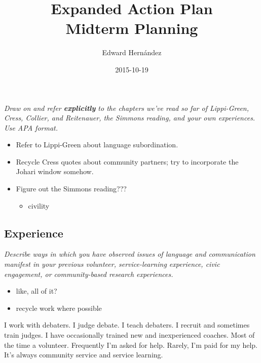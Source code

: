 \documentclass[doc,12pt]{apa6}
\begin{document}
\title{Expanded Action Plan \\ Midterm Planning}
\author{Edward Hern\'{a}ndez}
\date{2015-10-19}
\maketitle


\emph{Draw on and refer \textbf{explicitly} to the chapters we've read
so far of Lippi-Green, Cress, Collier, and Reitenauer, the Simmons
reading, and your own experiences. Use APA format.}

\nocite{Cress13}

\begin{itemize}
\itemsep1pt\parskip0pt
\item
  Refer to Lippi-Green about language subordination.
\item
  Recycle Cress quotes about community partners; try to incorporate the
  Johari window somehow.
\item
  Figure out the Simmons reading???

  \begin{itemize}
  \itemsep1pt\parskip0pt
  \item
    civility
  \end{itemize}
\end{itemize}

\subsection{Experience}\label{experience}

\emph{Describe ways in which you have observed issues of language and
communication manifest in your previous volunteer, service-learning
experience, civic engagement, or community-based research experiences.}

\begin{itemize}
\itemsep1pt\parskip0pt
\item
  like, all of it?
\item
  recycle work where possible
\end{itemize}

I work with debaters. I judge debate. I teach debaters. I recruit and
sometimes train judges. I have occasionally trained new and
inexperienced coaches. Most of the time a volunteer. Frequently I'm
asked for help. Rarely, I'm paid for my help. It's always community
service and service learning.
\end{document}
